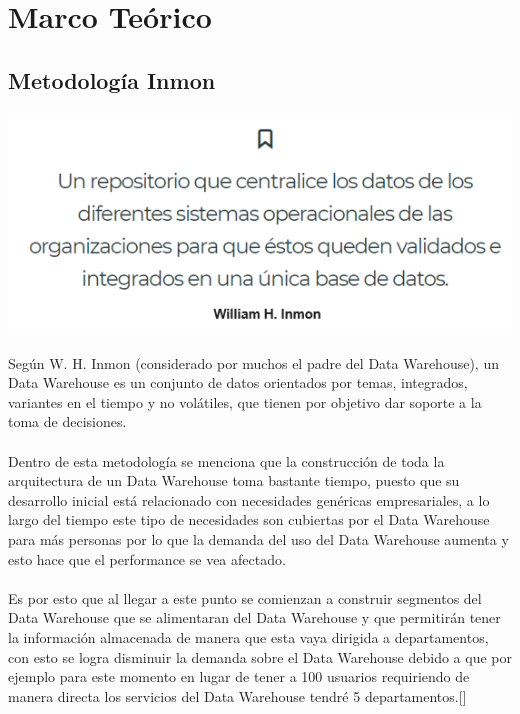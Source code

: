\documentclass[11pt,a4paper]{article}
\begin{document}
		\section{Marco Teórico}
		
			\subsection{Metodología Inmon }
			
			\begin{center}
				\includegraphics[scale=0.7]{./Imagenes/img01}
			\end{center}		
			
		Según W. H. Inmon (considerado por muchos el padre del Data Warehouse), un Data Warehouse es un conjunto de datos orientados por temas, integrados, variantes en el tiempo y no volátiles, que tienen por objetivo dar soporte a la toma de decisiones.\\
		\\
		Dentro de esta metodología se menciona que la construcción de toda la arquitectura de un Data Warehouse toma bastante tiempo, puesto que su desarrollo inicial está relacionado con necesidades genéricas empresariales, a lo largo del tiempo este tipo de necesidades son cubiertas por el Data Warehouse para más personas por lo que la demanda del uso del Data Warehouse aumenta y esto hace que el performance se vea afectado.\\
		\\
		Es por esto que al llegar a este punto se comienzan a construir segmentos del Data Warehouse que se alimentaran del Data Warehouse y que permitirán tener la información almacenada de manera que esta vaya dirigida a departamentos, con esto se logra disminuir la demanda sobre el Data Warehouse debido a que por ejemplo para este momento en lugar de tener a 100 usuarios requiriendo de manera directa los servicios del Data Warehouse tendré 5 departamentos.[\cite{metodBillInmon1}]
		
\end{document}
